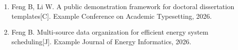 \begin{enumerate}
  \item Feng B, Li W. A public demonstration framework for doctoral dissertation templates[C]. Example Conference on Academic Typesetting, 2026.
  \item Feng B. Multi-source data organization for efficient energy system scheduling[J]. Example Journal of Energy Informatics, 2026.
\end{enumerate}
